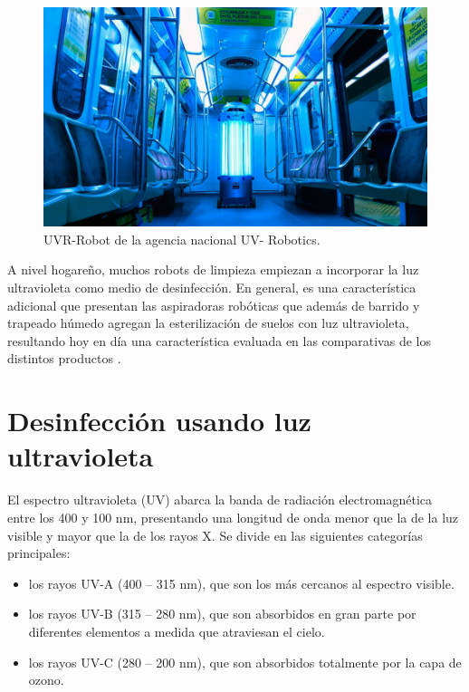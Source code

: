 \begin{figure}[h]
	\centering
	\includegraphics[width=12cm]{./Figures/uvrobot.jpeg}
	\caption{UVR-Robot de la agencia nacional UV- Robotics\protect\footnotemark.}
	\label{fig:uvrobot}
\end{figure}

A nivel hogareño, muchos robots de limpieza empiezan a incorporar la luz ultravioleta como medio de desinfección. En general, es una característica adicional que presentan las aspiradoras robóticas que además de barrido y trapeado húmedo agregan la esterilización de suelos con luz ultravioleta, resultando hoy en día una característica evaluada en las comparativas de los distintos productos  \citep{Bidcom}.


\section{Desinfección usando luz ultravioleta}

El espectro ultravioleta (UV) abarca la banda de radiación electromagnética entre los 400 y 100 nm, presentando una longitud de onda menor que la de la luz visible y mayor que la de los rayos X.  Se divide en las siguientes categorías principales:

\begin{itemize}
	\item los rayos UV-A (400 – 315 nm), que son los más cercanos al espectro visible.
	\item los rayos UV-B (315 – 280 nm), que son absorbidos en gran parte por diferentes elementos a medida que atraviesan el cielo.
	\item los rayos UV-C (280 – 200 nm), que son absorbidos totalmente por la capa de ozono.
\end{itemize}


